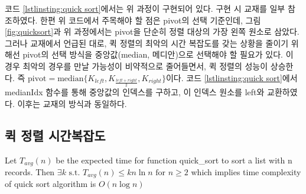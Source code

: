 \documentclass{article}
\begin{document}
코드 \ref{lstlinsting:quick sort}에서는 위 과정이 구현되어 있다. 구현 시 교재를 일부 참조하였다. 한편 위 코드에서 주목해야 할 점은 pivot의 선택 기준인데, 그림 \ref{fig:quicksort}과 위 과정에서는 pivot을 단순히 정렬 대상의 가장 왼쪽 원소로 삼았다. 그러나 교재에서 언급된 대로, 퀵 정렬의 최악의 시간 복잡도를 갖는 상황을 줄이기 위해선 pivot의 선택 방식을 중앙값(median, 메디안)으로 선택해야 할 필요가 있다. 이 경우 최악의 경우를 만날 가능성이 비약적으로 줄어들면서, 퀵 정렬의 성능이 상승한다. 즉 $\text{pivot} = \text{median}\{K_{left}, K_{\frac{left+right}{2}}, K_{right}\}$이다. 코드 \ref{lstlinsting:quick sort}에서 medianIdx 함수를 통해 중앙값의 인덱스를 구하고, 이 인덱스 원소를 left와 교환하였다. 이후는 교재의 방식과 동일하다.

\subsection{퀵 정렬 시간복잡도}
Let $T_{avg}(n)$ be the expected time for function quick\_sort to sort a list with n records. Then $\exists k \text{ s.t. } T_{avg}(n)\leq kn\ln n \text{ for } n \geq 2$ which implies time complexity of quick sort algorithm is $O(n\log n)$
\end{document}
